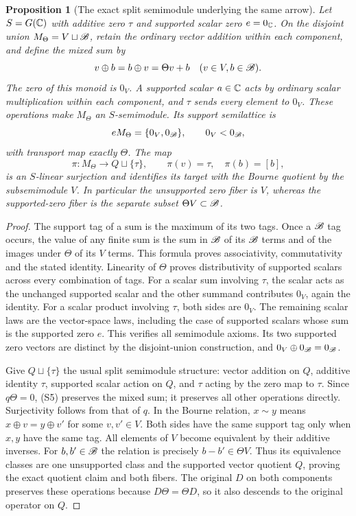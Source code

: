 \documentclass[11pt]{article}
\newtheorem{proposition}[theorem]{Proposition}
\begin{document}
\begin{proposition}[The exact split semimodule underlying the same arrow]
Let $S=G(\mathbb C)$ with additive zero $\tau$ and supported scalar zero
$e=0_\mathbb C$. On the disjoint union
$M_\Theta=V\sqcup\mathscr B$, retain the ordinary vector addition within
each component, and define the mixed sum by
\[
 v\oplus b=b\oplus v=\Theta v+b\quad(v\in V,b\in\mathscr B).
\]
The zero of this monoid is $0_V$. A supported scalar $a\in\mathbb C$
acts by ordinary scalar multiplication within each component, and
$\tau$ sends every element to $0_V$. These operations make
$M_\Theta$ an $S$-semimodule. Its support semilattice is
\[
 eM_\Theta=\{0_V,0_\mathscr B\},\qquad0_V<0_\mathscr B,
\]
with transport map exactly $\Theta$. The map
\[
 \pi:M_\Theta\longrightarrow Q\sqcup\{\tau\},\qquad
 \pi(v)=\tau,\quad\pi(b)=[b],
 \tag{S5}
\]
is an $S$-linear surjection and identifies its target with the Bourne
quotient by the subsemimodule $V$. In particular the unsupported
zero fiber is $V$, whereas the supported-zero fiber is the separate
subset $\Theta V\subset\mathscr B$.
\end{proposition}
\begin{proof}
The support tag of a sum is the maximum of its two tags. Once a
$\mathscr B$ tag occurs, the value of any finite sum is the sum in $\mathscr B$
of its $\mathscr B$ terms and of the images under $\Theta$ of its $V$
terms. This formula proves associativity, commutativity and the
stated identity. Linearity of $\Theta$ proves distributivity of
supported scalars across every combination of tags. For a scalar
sum involving $\tau$, the scalar acts as the unchanged supported
scalar and the other summand contributes $0_V$, again the identity.
For a scalar product involving $\tau$, both sides are $0_V$.
The remaining scalar laws are the vector-space laws, including
the case of supported scalars whose sum is the supported zero $e$.
This verifies all semimodule axioms. Its two supported zero vectors
are distinct by the disjoint-union construction, and
$0_V\oplus0_\mathscr B=0_\mathscr B$.

Give $Q\sqcup\{\tau\}$ the usual split semimodule structure:
vector addition on $Q$, additive identity $\tau$, supported scalar
action on $Q$, and $\tau$ acting by the zero map to $\tau$.
Since $q\Theta=0$, (S5) preserves the mixed sum; it preserves all
other operations directly. Surjectivity follows from that of $q$.
In the Bourne relation, $x\sim y$ means
$x\oplus v=y\oplus v'$ for some $v,v'\in V$.
Both sides have the same support tag only when $x,y$ have the same
tag. All elements of $V$ become equivalent by their additive
inverses. For $b,b'\in\mathscr B$ the relation is precisely
$b-b'\in\Theta V$. Thus its equivalence classes are one unsupported
class and the supported vector quotient $Q$, proving the exact
quotient claim and both fibers. The original $D$ on both components
preserves these operations because $D\Theta=\Theta D$, so it also
descends to the original operator on $Q$.
\end{proof}
\end{document}
